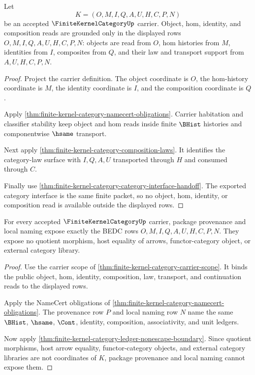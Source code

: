 \begin{theorem}
\label{thm:finite-kernel-category-carrier-scope}
Let
$$
K=(O,M,I,Q,A,U,H,C,P,N)
$$
be an accepted $\FiniteKernelCategoryUp$ carrier. Object, hom, identity, and composition reads are grounded only in the displayed rows $O,M,I,Q,A,U,H,C,P,N$: objects are read from $O$, hom histories from $M$, identities from $I$, composites from $Q$, and their law and transport support from $A,U,H,C,P,N$.
\end{theorem}
\begin{proof}
Project the carrier definition. The object coordinate is $O$, the hom-history coordinate is $M$, the identity coordinate is $I$, and the composition coordinate is $Q$.

Apply \autoref{thm:finite-kernel-category-namecert-obligations}. Carrier habitation and classifier stability keep object and hom reads inside finite $\BHist$ histories and componentwise $\hsame$ transport.

Next apply \autoref{thm:finite-kernel-category-composition-laws}. It identifies the category-law surface with $I,Q,A,U$ transported through $H$ and consumed through $C$.

Finally use \autoref{thm:finite-kernel-category-category-interface-handoff}. The exported category interface is the same finite packet, so no object, hom, identity, or composition read is available outside the displayed rows.
\end{proof}

\begin{theorem}
\label{thm:finite-kernel-category-package-namecert-scope}
For every accepted $\FiniteKernelCategoryUp$ carrier, package provenance and local naming expose exactly the BEDC rows $O,M,I,Q,A,U,H,C,P,N$. They expose no quotient morphism, host equality of arrows, functor-category object, or external category library.
\end{theorem}
\begin{proof}
Use the carrier scope of \autoref{thm:finite-kernel-category-carrier-scope}. It binds the public object, hom, identity, composition, law, transport, and continuation reads to the displayed rows.

Apply the NameCert obligations of \autoref{thm:finite-kernel-category-namecert-obligations}. The provenance row $P$ and local naming row $N$ name the same $\BHist$, $\hsame$, $\Cont$, identity, composition, associativity, and unit ledgers.

Now apply \autoref{thm:finite-kernel-category-ledger-nonescape-boundary}. Since quotient morphisms, host arrow equality, functor-category objects, and external category libraries are not coordinates of $K$, package provenance and local naming cannot expose them.
\end{proof}

